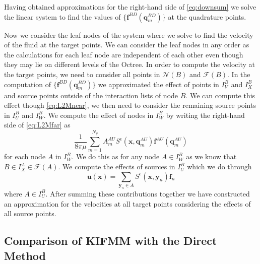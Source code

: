 Having obtained approximations for the right-hand side of \cref{eq:downsum} we solve the linear system to find the values of $\{\bm{f}^{BD}(\bm{q}^{BD}_m)\}$ at the quadrature points.

Now we consider the leaf nodes of the system where we solve to find the velocity of the fluid at the target points. We can consider the leaf nodes in any order as the calculations for each leaf node are independent of each other even though they may lie on different levels of the Octree. In order to compute the velocity at the target points, we need to consider all points in $\mathcal{N}(B)$ and $\mathcal{F}(B)$. In the computation of  $\{\bm{f}^{BD}(\bm{q}^{BD}_m)\}$ we approximated the effect of points in $I_V^B$ and $I_X^B$ and source points outside of the interaction lists of node $B$. We can compute this effect though \cref{eq:L2Mnear}, we then need to consider the remaining source points in $I_U^B$ and $I_W^B$. We compute the effect of nodes in $I_W^B$ by writing the right-hand side of \cref{eq:L2Mfar} as 
\begin{equation*}
    \frac{1}{8 \pi \mu} \sum_{m=1}^{N_{q}} A_{m}^{AU} S^\epsilon\left(\bm{x}, \bm{q}_{m}^{A U}\right) \bm{f}^{A U}\left(\bm{q}_{m}^{A U}\right)
\end{equation*}
for each node $A$ in $I_W^B$. We do this as for any node $A \in I_W^B$ as we know that $B \in I_X^A \in \mathcal{F}(A)$. We compute the effects of sources in $I_U^B$ which we do through 
\begin{equation}
\label{eq:U}
    \bm{u}(\bm{x}) = \sum_{{\bm{y}}_n\in A} S^\epsilon(\bm{x},{\bm{y}}_n){\bm{f}}_n
\end{equation}
where $A \in I_U^B$. After summing these contributions together we have constructed an approximation for the velocities at all target points considering the effects of all source points.

\subsection{Comparison of KIFMM with the Direct Method}


